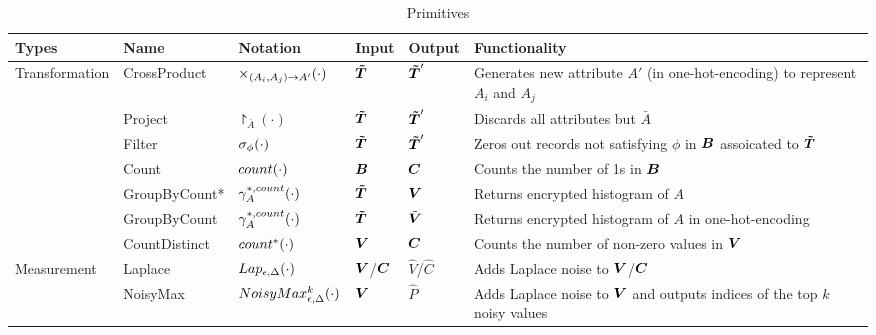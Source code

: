 

\begin{table*}[]
\small{
\caption {\system Primitives}\label{tab:primitives}
\begin{tabular}{|l|l|l|l|l|l|}
\hline
\bf{Types}                           & \bf{Name}         & \bf{Notation} & \bf{Input} & \bf{Output} & \bf{Functionality} \\ \hline \hline
\multirow{7}{*}{Transformation} & CrossProduct &  $\times_{(A_i,A_j)\rightarrow A'}(\cdot)$ &  $\boldsymbol{\tilde{T}}$   &  $\boldsymbol{\tilde{T}}'$   & Generates new attribute $A'$ (in one-hot-encoding) to represent $A_i$ and $A_j$  \\ \cline{2-6}
                                & Project      & $\project_{\bar{A}}(\cdot)$  &  $\boldsymbol{\tilde{T}}$       &  $\boldsymbol{\tilde{T}}'$       &  Discards all attributes but $\bar{A}$ \\ \cline{2-6}
                                & Filter       & $\sigma_{\phi}(\cdot)$   &  $\boldsymbol{\tilde{T}}$      &   $\boldsymbol{\tilde{T}}'$     &  Zeros out records not satisfying $\phi$    in $\boldsymbol{B}$ assoicated to $\boldsymbol{\tilde{T}}$         \\ \cline{2-6}
                                & Count              & $count(\cdot)$         & $\boldsymbol{B}$  &  $\boldsymbol{C}$    &  Counts the number of 1s in $\boldsymbol{B}$               \\ \cline{2-6}
                                & GroupByCount*              & $\gamma^{*,count}_{A}(\cdot)$ &  $\boldsymbol{\tilde{T}}$  & $\boldsymbol{V}$    & Returns encrypted histogram of $A$                \\ \cline{2-6}
                                & GroupByCount              & $\gamma^{*,count}_{A}(\cdot)$    &$\boldsymbol{\tilde{T}}$       & $\tilde{\boldsymbol{V}}$        &  Returns encrypted histogram of $A$ in one-hot-encoding    \\ \cline{2-6}
                                & CountDistinct             & $count^*(\cdot)$     &    $\boldsymbol{V}$   & $\boldsymbol{C}$   &  Counts the number of non-zero values in $\boldsymbol{V}$       \\ \hline
\multirow{2}{*}{Measurement}    & Laplace      & $Lap_{\epsilon,\Delta}(\cdot)$    &  $\boldsymbol{V}$/$\boldsymbol{C}$    &   $\hat{V}$/$\hat{C}$    &  Adds Laplace noise to $\boldsymbol{V}$/$\boldsymbol{C}$    \\ \cline{2-6}
                                & NoisyMax     & $NoisyMax_{\epsilon,\Delta}^k(\cdot)$         & $\boldsymbol{V}$       &  $\hat{P}$      &  Adds Laplace noise to $\boldsymbol{V}$ and outputs indices of the top $k$ noisy values              \\ \hline
\end{tabular}
}
\end{table*}


